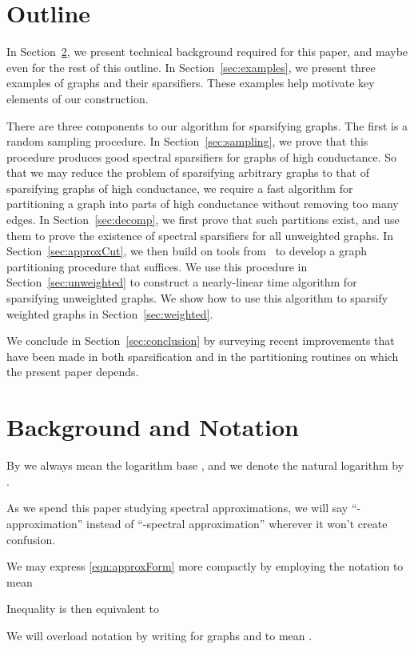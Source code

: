\documentclass[11pt]{article}
\begin{document}
\section{Outline}
In Section~\ref{sec:background}, we present technical background required
  for this paper, and maybe even for the rest of this outline.
In Section~\ref{sec:examples}, we present three examples of graphs and
  their sparsifiers.
These examples help motivate key elements of our construction.


There are three components to our algorithm for sparsifying graphs.
The first is a random sampling procedure.
In Section~\ref{sec:sampling}, we prove that this procedure produces
  good spectral sparsifiers for graphs of high conductance.
So that we may reduce the problem of sparsifying arbitrary graphs
  to that of sparsifying graphs of high conductance, we require
  a fast algorithm for partitioning a graph into parts of high conductance
  without removing too many edges.
In Section~\ref{sec:decomp}, we first prove that such partitions exist,
  and use them to prove the existence of spectral sparsifiers for
  all unweighted graphs.
In Section~\ref{sec:approxCut}, we then build on tools from~\cite{SpielmanTengCuts}
  to develop a graph partitioning procedure that suffices.
We use this procedure in Section~\ref{sec:unweighted} to construct
  a nearly-linear time algorithm
  for sparsifying unweighted graphs.
We show how to use this algorithm to sparsify
  weighted graphs in Section~\ref{sec:weighted}.

We conclude in Section~\ref{sec:conclusion} by surveying recent improvements
  that have been made in both sparsification and in the
  partitioning routines on which the present paper depends.

\section{Background and Notation}\label{sec:background}
By  we always mean the logarithm base , and we denote the
  natural logarithm by .

As we spend this paper studying spectral approximations, we will say
  ``-approximation'' instead of 
  ``-spectral approximation'' wherever it won't create
  confusion.

We may express \eqref{eqn:approxForm} more compactly by employing the notation
   to mean

Inequality  is then equivalent to

We will overload notation by writing  for graphs  and 
  to mean .
\end{document}
